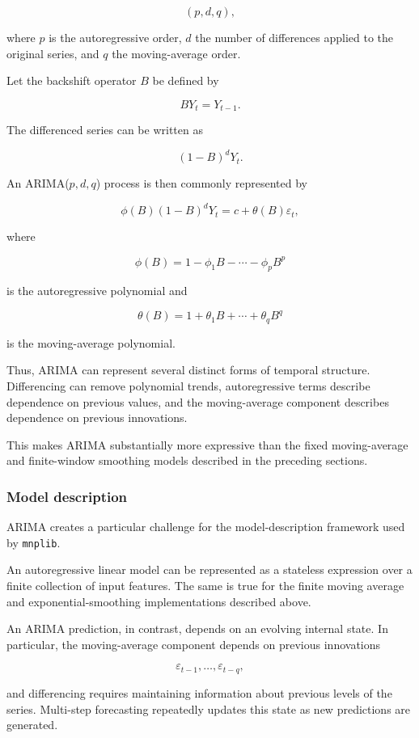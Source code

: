 \[
(p,d,q),
\]

where \(p\) is the autoregressive order, \(d\) the number of differences applied
to the original series, and \(q\) the moving-average order.

Let the backshift operator \(B\) be defined by

\[
BY_t=Y_{t-1}.
\]

The differenced series can be written as

\[
(1-B)^dY_t.
\]

An ARIMA(\(p,d,q\)) process is then commonly represented by

\[
\phi(B)(1-B)^dY_t
=
c+\theta(B)\varepsilon_t,
\]

where

\[
\phi(B)
=
1-\phi_1B-\cdots-\phi_pB^p
\]

is the autoregressive polynomial and

\[
\theta(B)
=
1+\theta_1B+\cdots+\theta_qB^q
\]

is the moving-average polynomial.

Thus, ARIMA can represent several distinct forms of temporal structure.
Differencing can remove polynomial trends, autoregressive terms describe
dependence on previous values, and the moving-average component describes
dependence on previous innovations.

This makes ARIMA substantially more expressive than the fixed moving-average
and finite-window smoothing models described in the preceding sections.

\subsubsection{Model description}

ARIMA creates a particular challenge for the model-description framework used
by \texttt{mnplib}.

An autoregressive linear model can be represented as a stateless expression over
a finite collection of input features. The same is true for the finite moving
average and exponential-smoothing implementations described above.

An ARIMA prediction, in contrast, depends on an evolving internal state. In
particular, the moving-average component depends on previous innovations

\[
\varepsilon_{t-1},\ldots,\varepsilon_{t-q},
\]

and differencing requires maintaining information about previous levels of the
series. Multi-step forecasting repeatedly updates this state as new predictions
are generated.

